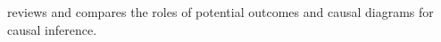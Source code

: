 \begin{HomeworkProblem}\label{exr:16-3}

\citet{imbens2020potential} reviews and compares the roles of potential outcomes and causal diagrams for causal inference.




\end{HomeworkProblem}
